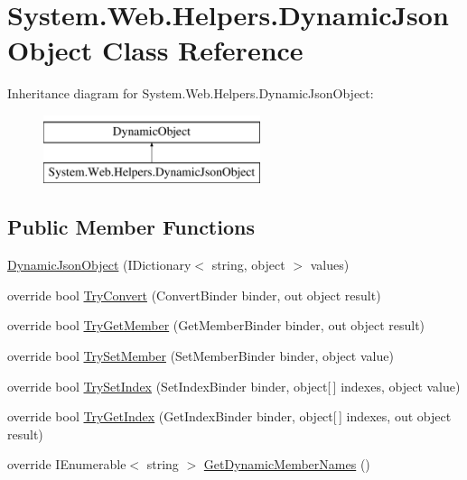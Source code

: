 \hypertarget{classSystem_1_1Web_1_1Helpers_1_1DynamicJsonObject}{}\section{System.\+Web.\+Helpers.\+Dynamic\+Json\+Object Class Reference}
\label{classSystem_1_1Web_1_1Helpers_1_1DynamicJsonObject}
Inheritance diagram for System.\+Web.\+Helpers.\+Dynamic\+Json\+Object\+:\begin{figure}[H]
\begin{center}
\leavevmode
\includegraphics[height=2.000000cm]{classSystem_1_1Web_1_1Helpers_1_1DynamicJsonObject}
\end{center}
\end{figure}
\subsection*{Public Member Functions}
\begin{DoxyCompactItemize}
\item 
\hyperlink{classSystem_1_1Web_1_1Helpers_1_1DynamicJsonObject_a0a7c3916979c303c6d4da79883d1a7be_a0a7c3916979c303c6d4da79883d1a7be}{Dynamic\+Json\+Object} (I\+Dictionary$<$ string, object $>$ values)
\item 
override bool \hyperlink{classSystem_1_1Web_1_1Helpers_1_1DynamicJsonObject_ac56513cadafc61180a25a4810047af56_ac56513cadafc61180a25a4810047af56}{Try\+Convert} (Convert\+Binder binder, out object result)
\item 
override bool \hyperlink{classSystem_1_1Web_1_1Helpers_1_1DynamicJsonObject_a3ce7ca4551d2b621d4d35db30ea69698_a3ce7ca4551d2b621d4d35db30ea69698}{Try\+Get\+Member} (Get\+Member\+Binder binder, out object result)
\item 
override bool \hyperlink{classSystem_1_1Web_1_1Helpers_1_1DynamicJsonObject_a2751e8fe84adaf0dd4c3430224b10203_a2751e8fe84adaf0dd4c3430224b10203}{Try\+Set\+Member} (Set\+Member\+Binder binder, object value)
\item 
override bool \hyperlink{classSystem_1_1Web_1_1Helpers_1_1DynamicJsonObject_a6d9229dd7bc1149540e8c71b3755ed87_a6d9229dd7bc1149540e8c71b3755ed87}{Try\+Set\+Index} (Set\+Index\+Binder binder, object\mbox{[}$\,$\mbox{]} indexes, object value)
\item 
override bool \hyperlink{classSystem_1_1Web_1_1Helpers_1_1DynamicJsonObject_a6b5b97ca03d683937092e8d5506c20f7_a6b5b97ca03d683937092e8d5506c20f7}{Try\+Get\+Index} (Get\+Index\+Binder binder, object\mbox{[}$\,$\mbox{]} indexes, out object result)
\item 
override I\+Enumerable$<$ string $>$ \hyperlink{classSystem_1_1Web_1_1Helpers_1_1DynamicJsonObject_a8b74bfcba4fe3d5ac1802c041159cbab_a8b74bfcba4fe3d5ac1802c041159cbab}{Get\+Dynamic\+Member\+Names} ()
\end{DoxyCompactItemize}


